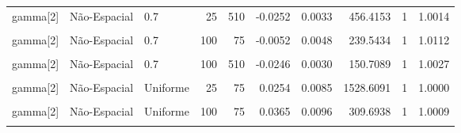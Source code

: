 \documentclass[
]{article}
\begin{document}
\begin{longtable}[t]{lllrrrrrrr}
\cmidrule{1-10}\pagebreak[0]
gamma[2] & Não-Espacial & 0.7 & 25 & 510 & -0.0252 & 0.0033 & 456.4153 & 1 & 1.0014\\
\cmidrule{1-10}\pagebreak[0]
\cellcolor{gray!10}{gamma[2]} & \cellcolor{gray!10}{Espacial} & \cellcolor{gray!10}{0.7} & \cellcolor{gray!10}{100} & \cellcolor{gray!10}{75} & \cellcolor{gray!10}{0.0520} & \cellcolor{gray!10}{0.0147} & \cellcolor{gray!10}{135.1992} & \cellcolor{gray!10}{1} & \cellcolor{gray!10}{1.0471}\\
\cmidrule{1-10}\pagebreak[0]
gamma[2] & Não-Espacial & 0.7 & 100 & 75 & -0.0052 & 0.0048 & 239.5434 & 1 & 1.0112\\
\cmidrule{1-10}\pagebreak[0]
\cellcolor{gray!10}{gamma[2]} & \cellcolor{gray!10}{Espacial} & \cellcolor{gray!10}{0.7} & \cellcolor{gray!10}{100} & \cellcolor{gray!10}{510} & \cellcolor{gray!10}{0.2376} & \cellcolor{gray!10}{0.0616} & \cellcolor{gray!10}{45.5626} & \cellcolor{gray!10}{0} & \cellcolor{gray!10}{1.0597}\\
\cmidrule{1-10}\pagebreak[0]
gamma[2] & Não-Espacial & 0.7 & 100 & 510 & -0.0246 & 0.0030 & 150.7089 & 1 & 1.0027\\
\cmidrule{1-10}\pagebreak[0]
\cellcolor{gray!10}{gamma[2]} & \cellcolor{gray!10}{Espacial} & \cellcolor{gray!10}{Uniforme} & \cellcolor{gray!10}{25} & \cellcolor{gray!10}{75} & \cellcolor{gray!10}{0.0383} & \cellcolor{gray!10}{0.0111} & \cellcolor{gray!10}{1255.4639} & \cellcolor{gray!10}{1} & \cellcolor{gray!10}{1.0018}\\
\cmidrule{1-10}\pagebreak[0]
gamma[2] & Não-Espacial & Uniforme & 25 & 75 & 0.0254 & 0.0085 & 1528.6091 & 1 & 1.0000\\
\cmidrule{1-10}\pagebreak[0]
\cellcolor{gray!10}{gamma[2]} & \cellcolor{gray!10}{Espacial} & \cellcolor{gray!10}{Uniforme} & \cellcolor{gray!10}{100} & \cellcolor{gray!10}{75} & \cellcolor{gray!10}{0.0448} & \cellcolor{gray!10}{0.0120} & \cellcolor{gray!10}{332.5966} & \cellcolor{gray!10}{1} & \cellcolor{gray!10}{1.0004}\\
\cmidrule{1-10}\pagebreak[0]
gamma[2] & Não-Espacial & Uniforme & 100 & 75 & 0.0365 & 0.0096 & 309.6938 & 1 & 1.0009\\
\cmidrule{1-10}\pagebreak[0]
\cellcolor{gray!10}{gamma[2]} & \cellcolor{gray!10}{Espacial} & \cellcolor{gray!10}{Uniforme} & \cellcolor{gray!10}{100} & \cellcolor{gray!10}{510} & \cellcolor{gray!10}{0.0060} & \cellcolor{gray!10}{0.0045} & \cellcolor{gray!10}{172.5523} & \cellcolor{gray!10}{1} & \cellcolor{gray!10}{1.0147}\\

\end{longtable}
\end{document}
